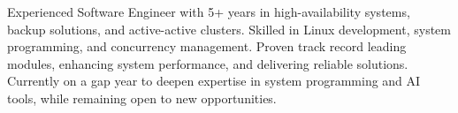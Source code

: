 

\begin{cvparagraph}

Experienced Software Engineer with 5+ years in high-availability systems, backup solutions, and active-active clusters. Skilled in Linux development, system programming, and concurrency management. Proven track record leading modules, enhancing system performance, and delivering reliable solutions.  Currently on a gap year to deepen expertise in system programming and AI tools, while remaining open to new opportunities.
\end{cvparagraph}
